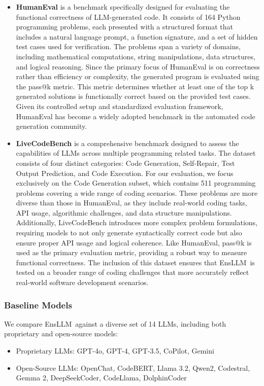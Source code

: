 \documentclass{article}
\newcommand{\tool}{EnsLLM}
\begin{document}
\begin{itemize}
    \item \textbf{HumanEval} \cite{humaneval} is a benchmark specifically designed for evaluating the functional correctness of LLM-generated code. It consists of 164 Python programming problems, each presented with a structured format that includes a natural language prompt, a function signature, and a set of hidden test cases used for verification. The problems span a variety of domains, including mathematical computations, string manipulations, data structures, and logical reasoning. Since the primary focus of HumanEval is on correctness rather than efficiency or complexity, the generated program is evaluated using the pass@k metric. This metric determines whether at least one of the top k generated solutions is functionally correct based on the provided test cases. Given its controlled setup and standardized evaluation framework, HumanEval has become a widely adopted benchmark in the automated code generation community.

    \item \textbf{LiveCodeBench} \cite{livecodebench} is a comprehensive benchmark designed to assess the capabilities of LLMs across multiple programming related tasks. The dataset consists of four distinct categories: Code Generation, Self-Repair, Test Output Prediction, and Code Execution. For our evaluation, we focus exclusively on the Code Generation subset, which contains 511 programming problems covering a wide range of coding scenarios. These problems are more diverse than those in HumanEval, as they include real-world coding tasks, API usage, algorithmic challenges, and data structure manipulations. Additionally, LiveCodeBench introduces more complex problem formulations, requiring models to not only generate syntactically correct code but also ensure proper API usage and logical coherence. Like HumanEval, pass@k is used as the primary evaluation metric, providing a robust way to measure functional correctness. The inclusion of this dataset ensures that \tool\ is tested on a broader range of coding challenges that more accurately reflect real-world software development scenarios.
\end{itemize}

\subsubsection{Baseline Models}
\leavevmode\par
We compare \tool\ against a diverse set of 14 LLMs, including both proprietary and open-source models:
\begin{itemize}
    \item Proprietary LLMs: GPT-4o, GPT-4, GPT-3.5, CoPilot, Gemini
    \item Open-Source LLMs: OpenChat, CodeBERT, Llama 3.2, Qwen2, Codestral, Gemma 2, DeepSeekCoder, CodeLlama, DolphinCoder
\end{itemize}
\end{document}
